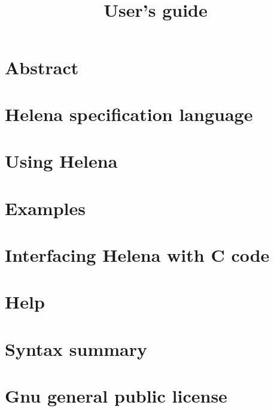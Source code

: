 \documentclass{book}
\title{\infooutil\\ User's guide}
\author{\infoauteur}
\newcommand\Chapter[3]
{
  \chapter{#1}
  \label{#2}
  
  \newpage
}
\begin{document}
\maketitle
\chapter*{Abstract}

\tableofcontents
\newpage
\Chapter{Helena specification language}{chapter_language}{language}
\Chapter{Using Helena}{chapter_using}{using}
\Chapter{Examples}{chapter_examples}{examples}
\Chapter{Interfacing Helena with C code}{chapter_interfacing}{interfacing}
\Chapter{Help}{chapter_help}{help}
\appendix
\Chapter{Syntax summary}{chapter_syntax}{syntax}
\Chapter{Gnu general public license}{chapter_license}{license.tex}
\printindex
\end{document}
